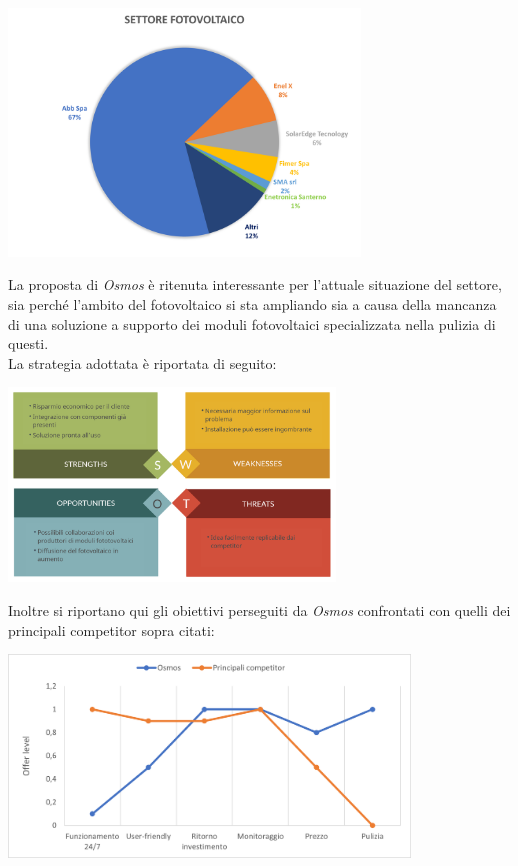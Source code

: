 \documentclass[a4paper, 12pt]{article}
\begin{document}
	\begin{center}
		\includegraphics[width=0.7\textwidth]{Images/suddivisione_settore.png}
	\end{center}
	La proposta di \emph{Osmos} è ritenuta interessante per l'attuale situazione del settore, sia perché l'ambito del fotovoltaico si sta ampliando sia a causa della mancanza di una soluzione a supporto dei moduli fotovoltaici specializzata nella pulizia di questi.\\
	La strategia adottata è riportata di seguito:
	\begin{center}
		\includegraphics[width=0.65\textwidth]{Images/SWOT2.png}%
	\end{center}
	Inoltre si riportano qui gli obiettivi perseguiti da \emph{Osmos} confrontati con quelli dei principali competitor sopra citati:
	\begin{center}
		\includegraphics[width=0.8\textwidth]{Images/curve_valore.png}%
	\end{center}
\end{document}
